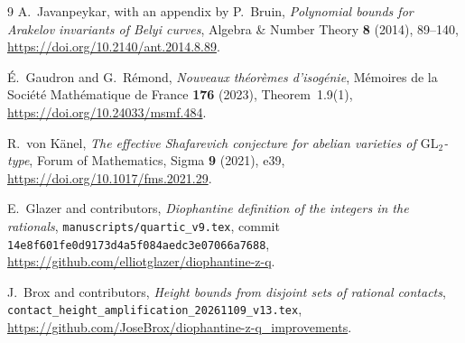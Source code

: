 \documentclass[11pt,a4paper]{article}
\theoremstyle{definition}
\begin{document}
\begin{thebibliography}{9}
A.~Javanpeykar, with an appendix by P.~Bruin,
\emph{Polynomial bounds for Arakelov invariants of Belyi curves},
Algebra \& Number Theory \textbf{8} (2014), 89--140,
\url{https://doi.org/10.2140/ant.2014.8.89}.

\'E.~Gaudron and G.~R\'emond,
\emph{Nouveaux th\'eor\`emes d'isog\'enie},
M\'emoires de la Soci\'et\'e Math\'ematique de France
\textbf{176} (2023), Theorem~1.9(1),
\url{https://doi.org/10.24033/msmf.484}.

R.~von K\"anel, \emph{The effective Shafarevich conjecture for abelian
varieties of $\mathrm{GL}_2$-type}, Forum of Mathematics, Sigma
\textbf{9} (2021), e39,
\url{https://doi.org/10.1017/fms.2021.29}.

E.~Glazer and contributors,
\emph{Diophantine definition of the integers in the rationals},
\texttt{manuscripts/quartic\_v9.tex}, commit
\texttt{14e8f601fe0d9173d4a5f084aedc3e07066a7688},
\url{https://github.com/elliotglazer/diophantine-z-q}.

J.~Brox and contributors,
\emph{Height bounds from disjoint sets of rational contacts},
\texttt{contact\_height\_amplification\_20261109\_v13.tex},
\url{https://github.com/JoseBrox/diophantine-z-q_improvements}.
\end{thebibliography}
\end{document}
